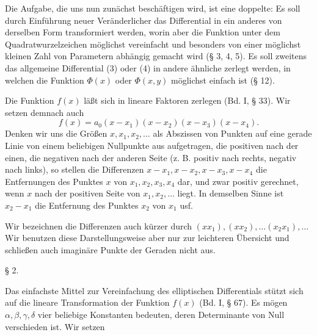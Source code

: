 Die Aufgabe, die uns nun zunächst beschäftigen wird, ist eine doppelte: Es soll durch Einführung neuer Veränderlicher das Differential
in ein anderes von derselben Form transformiert werden, worin aber die Funktion unter dem Quadratwurzelzeichen möglichst vereinfacht und besonders von einer möglichst kleinen Zahl von Parametern abhängig gemacht wird (§ 3, 4, 5). Es soll zweitens das allgemeine Differential (3) oder (4) in andere ähnliche zerlegt werden, in welchen die Funktion $\Phi(x)$ oder $\Phi(x,y)$ möglichst einfach ist (§ 12).

Die Funktion $f(x)$ läßt sich in lineare Faktoren zerlegen (Bd. I, § 33). Wir setzen demnach auch
\[
f(x) = a_0(x-x_1)(x-x_2)(x-x_3)(x-x_4).
\]
Denken wir uns die Größen $x, x_1, x_2, \ldots$ als Abszissen von Punkten auf eine gerade Linie von einem beliebigen Nullpunkte aus aufgetragen, die positiven nach der einen, die negativen nach der anderen Seite (z. B. positiv nach rechts, negativ nach links), so stellen die Differenzen $x-x_1, x-x_2, x-x_3, x-x_4$ die Entfernungen des Punktes $x$ von $x_1, x_2, x_3, x_4$ dar, und zwar positiv gerechnet, wenn $x$ nach der positiven Seite von $x_1, x_2, \ldots$ liegt. In demselben Sinne ist $x_2-x_1$ die Entfernung des Punktes $x_2$ von $x_1$ usf.

Wir bezeichnen die Differenzen auch kürzer durch $(xx_1), (xx_2), \ldots (x_2x_1), \ldots$ Wir benutzen diese Darstellungsweise aber nur zur leichteren Übersicht und schließen auch imaginäre Punkte der Geraden nicht aus.

§ 2. 

Das einfachste Mittel zur Vereinfachung des elliptischen Differentials stützt sich auf die lineare Transformation der Funktion $f(x)$ (Bd. I, § 67). Es mögen $\alpha, \beta, \gamma, \delta$ vier beliebige Konstanten bedeuten, deren Determinante
von Null verschieden ist. Wir setzen
